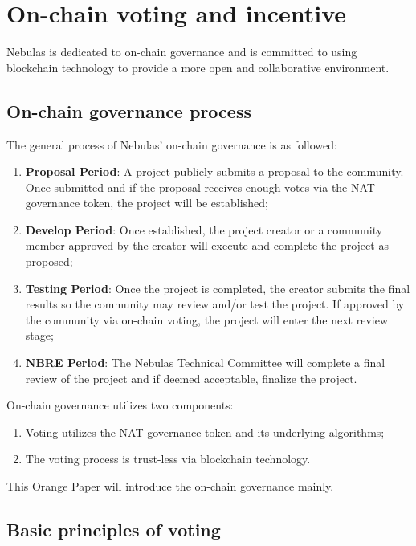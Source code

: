 \section{On-chain voting and incentive}

Nebulas is dedicated to on-chain governance and is committed to using blockchain technology to provide a more open and collaborative environment.

\subsection{On-chain governance process}
\label{governance}

The general process of Nebulas' on-chain governance is as followed:

\begin{enumerate}
	\item \textbf{Proposal Period}: A project publicly submits a proposal to the community. Once submitted and if the proposal receives enough votes via the NAT governance token, the project will be established;
	\item \textbf{Develop Period}: Once established, the project creator or a community member approved by the creator will execute and complete the project as proposed;
	\item \textbf{Testing Period}: Once the project is completed, the creator submits the final results so the community may review and/or test the project. If approved by the community via on-chain voting, the project will enter the next review stage;
	\item \textbf{NBRE Period}: The Nebulas Technical Committee will complete a final review of the project and if deemed acceptable, finalize the project.
\end{enumerate}

On-chain governance utilizes two components:

\begin{enumerate}
	\item Voting utilizes the NAT governance token and its underlying algorithms;
	\item The voting process is trust-less via blockchain technology.
\end{enumerate}

This Orange Paper will introduce the on-chain governance mainly.

\subsection{Basic principles of voting}

